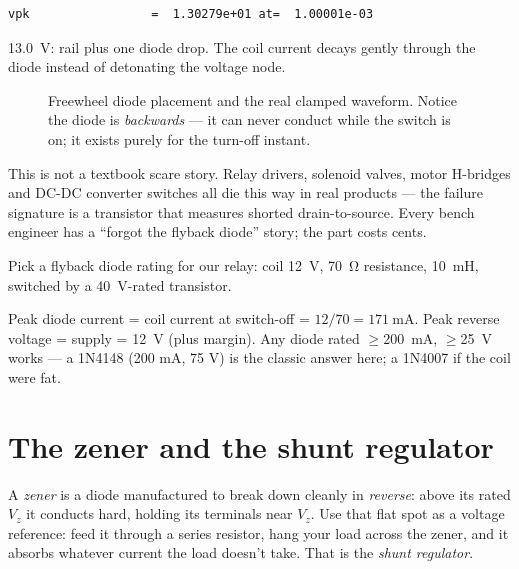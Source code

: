 \begin{lstlisting}[caption={Output, verbatim. Same relay, same switch ---
the \qty{1646}{\volt} spike is gone.}]
vpk                 =  1.30279e+01 at=  1.00001e-03
\end{lstlisting}

\qty{13.0}{\volt}: rail plus one diode drop. The coil current decays
gently through the diode instead of detonating the voltage node.

\begin{figure}[htbp]
\centering

\caption{Freewheel diode placement and the real clamped waveform. Notice
the diode is \emph{backwards} --- it can never conduct while the switch
is on; it exists purely for the turn-off instant.}
\label{fig:flybackd}
\end{figure}

\begin{remark}
This is not a textbook scare story. Relay drivers, solenoid valves,
motor H-bridges and DC-DC converter switches all die this way in real
products --- the failure signature is a transistor that measures
shorted drain-to-source. Every bench engineer has a ``forgot the
flyback diode'' story; the part costs cents.
\end{remark}

\begin{exercise}[hard]
Pick a flyback diode rating for our relay: coil \qty{12}{\volt},
\qty{70}{\ohm} resistance, \qty{10}{\milli\henry}, switched by a
\qty{40}{\volt}-rated transistor.
\begin{solution}
Peak diode current = coil current at switch-off =
$12/70=\qty{171}{\milli\ampere}$. Peak reverse voltage = supply =
\qty{12}{\volt} (plus margin). Any diode rated $\ge$\qty{200}{\milli\ampere},
$\ge$\qty{25}{\volt} works --- a 1N4148 (200 mA, 75 V) is the classic
answer here; a 1N4007 if the coil were fat.
\end{solution}
\end{exercise}

\section{The zener and the shunt regulator}\label{sec:diode-zener}

A \emph{zener} is a diode manufactured to break down cleanly in
\emph{reverse}: above its rated $V_z$ it conducts hard, holding its
terminals near $V_z$. Use that flat spot as a voltage reference: feed it
through a series resistor, hang your load across the zener, and it
absorbs whatever current the load doesn't take. That is the \emph{shunt
regulator}.

